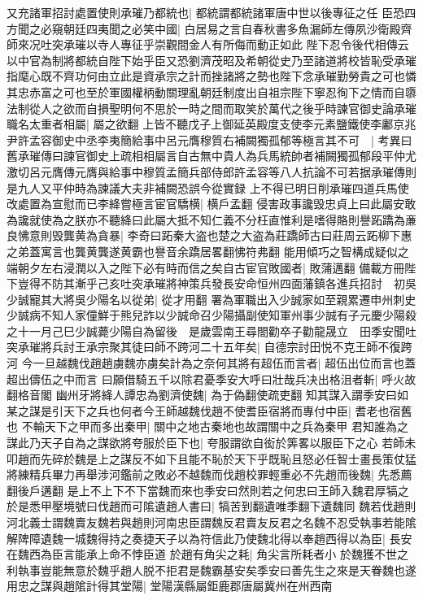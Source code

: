 又充諸軍招討處置使則承璀乃都統也|{
	都統謂都統諸軍唐中世以後專征之任}
臣恐四方聞之必窺朝廷四夷聞之必笑中國|{
	白居易之言自春秋書多魚漏師左傳夙沙衛殿齊師來况吐突承璀以寺人專征乎崇觀間金人有所侮而動正如此}
陛下忍令後代相傳云以中官為制將都統自陛下始乎臣又恐劉濟茂昭及希朝從史乃至諸道將校皆恥受承璀指麾心既不齊功何由立此是資承宗之計而挫諸將之勢也陛下念承璀勤勞貴之可也憐其忠赤富之可也至於軍國權柄動關理亂朝廷制度出自祖宗陛下寧忍徇下之情而自隳法制從人之欲而自損聖明何不思於一時之間而取笑於萬代之後乎時諫官御史論承璀職名太重者相屬|{
	屬之欲翻}
上皆不聽戊子上御延英殿度支使李元素鹽鐵使李鄘京兆尹許孟容御史中丞李夷簡給事中呂元膺穆質右補闕獨孤郁等極言其不可　|{
	考異曰舊承璀傳曰諫官御史上疏相相屬言自古無中貴人為兵馬統帥者補闕獨孤郁段平仲尤激切呂元膺傳元膺與給事中穆質孟簡兵部侍郎許孟容等八人抗論不可若据承璀傳則是九人又平仲時為諫議大夫非補闕恐誤今從實録}
上不得已明日削承璀四道兵馬使改處置為宣慰而已李絳嘗極言宦官驕横|{
	横戶孟翻}
侵害政事讒毁忠貞上曰此屬安敢為讒就使為之朕亦不聽絳曰此屬大抵不知仁義不分枉直惟利是嗜得賂則譽跖蹻為亷良怫意則毁龔黄為貪暴|{
	李奇曰跖秦大盗也楚之大盗為莊蹻師古曰莊周云跖柳下惠之弟蓋寓言也龔黄龔遂黄霸也譽音余蹻居畧翻怫符弗翻}
能用傾巧之智構成疑似之端朝夕左右浸潤以入之陛下必有時而信之矣自古宦官敗國者|{
	敗蒲邁翻}
備載方冊陛下豈得不防其漸乎己亥吐突承璀將神策兵發長安命恒州四面藩鎮各進兵招討　初吳少誠寵其大將吳少陽名以從弟|{
	從才用翻}
署為軍職出入少誠家如至親累遷申州刺史少誠病不知人家僮鮮于熊兒詐以少誠命召少陽攝副使知軍州事少誠有子元慶少陽殺之十一月己巳少誠薨少陽自為留後　是歲雲南王尋閤勸卒子勸龍晟立　田季安聞吐突承璀將兵討王承宗聚其徒曰師不跨河二十五年矣|{
	自德宗討田悦不克王師不復跨河}
今一旦越魏伐趙趙虜魏亦虜矣計為之奈何其將有超伍而言者|{
	超伍出位而言也蓋超出儔伍之中而言}
曰願借騎五千以除君憂季安大呼曰壯哉兵决出格沮者斬|{
	呼火故翻格音閣}
幽州牙將絳人譚忠為劉濟使魏|{
	為于偽翻使疏吏翻}
知其謀入謂季安曰如某之謀是引天下之兵也何者今王師越魏伐趙不使耆臣宿將而專付中臣|{
	耆老也宿舊也}
不輸天下之甲而多出秦甲|{
	關中之地古秦地也故謂關中之兵為秦甲}
君知誰為之謀此乃天子自為之謀欲將夸服於臣下也|{
	夸服謂欲自衒於筭畧以服臣下之心}
若師未叩趙而先碎於魏是上之謀反不如下且能不恥於天下乎既恥且怒必任智士畫長策仗猛將練精兵畢力再舉涉河鑑前之敗必不越魏而伐趙校罪輕重必不先趙而後魏|{
	先悉薦翻後戶遘翻}
是上不上下不下當魏而來也季安曰然則若之何忠曰王師入魏君厚犒之於是悉甲壓境號曰伐趙而可隂遺趙人書曰|{
	犒苦到翻遺唯季翻下遺魏同}
魏若伐趙則河北義士謂魏賣友魏若與趙則河南忠臣謂魏反君賣友反君之名魏不忍受執事若能隂解陴障遺魏一城魏得持之奏捷天子以為符信此乃使魏北得以奉趙西得以為臣|{
	長安在魏西為臣言能承上命不悖臣道}
於趙有角尖之耗|{
	角尖言所耗者小}
於魏獲不世之利執事豈能無意於魏乎趙人脱不拒君是魏霸基安矣季安曰善先生之來是天眷魏也遂用忠之謀與趙隂計得其堂陽|{
	堂陽漢縣屬鉅鹿郡唐屬冀州在州西南}
